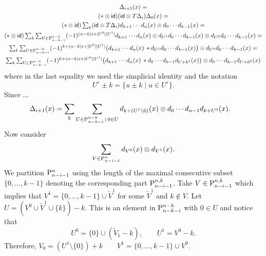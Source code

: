 \documentclass{amsart}
\begin{document}
	\begin{gather*}
		\Delta_{i+1}(x) = \\
		(\ast \otimes \mathsf{id})(\mathsf{id} \otimes T\Delta_i) \Delta_0(x) = \\
		(\ast \otimes \mathsf{id}) \textstyle\sum_k (\mathsf{id} \otimes T\Delta_i) d_{k+1} \dotsm d_n(x) \otimes d_{0} \dotsm d_{k-1}(x) = \\
		(\ast \otimes \mathsf{id})\textstyle\sum_k \sum_{U \in \mathrm{P}^{n-k}_{n-k-i}} (-1)^{(n-k)i+\lvert U^0\rvert\lvert U^1\rvert} d_{k+1} \dotsm d_n(x) \otimes d_{U^1} d_{0} \dotsm d_{k-1}(x) \otimes d_{U^0} d_{0} \dotsm d_{k-1}(x) = \\
		\textstyle\sum_k \sum_{U \in \mathrm{P}^{n-k}_{n-k-i}} (-1)^{k+(n-k)i+\lvert U^0\rvert\lvert U^1\rvert} \big( d_{k+1} \dotsm d_n(x) \, \ast d_{U^1} d_{0} \dotsm d_{k-1}(x) \big) \otimes d_{U^0} d_{0} \dotsm d_{k-1}(x) = \\
		\textstyle\sum_k \sum_{U \in \mathrm{P}^{n-k}_{n-k-i}} (-1)^{k+(n-k)i+\lvert U^0\rvert\lvert U^1\rvert} \big( d_{k+1} \dotsm d_n(x) \, \ast d_{0} \dotsm d_{k-1} d_{U+k^1}(x) \big) \otimes d_{0} \dotsm d_{k-1} d_{U+k^0}(x)
	\end{gather*}
	where in the last equality we used the simplicial identity and the notation
	\[
	U^\varepsilon \pm k = \{u \pm k \mid u \in U^\varepsilon\}.
	\]
	Since ...
	\begin{align*}
		\Delta_{i+1}(x) &=
		\sum_k \sum_{U \in \mathrm{P}^{n-k}_{n-k-i} \,|\, 0 \in U} d_{k+(U^1 \setminus 0)}(x) \otimes d_{0} \dotsm d_{u-1} d_{k+U^0}(x).
	\end{align*}
	Now consider
	\[
	\sum_{V \in \mathrm{P}^{n}_{n-i-1}} d_{V^0}(x) \otimes d_{V^1}(x).
	\]
	We partition $\mathrm{P}^{n}_{n-i-1}$ using the length of the maximal consecutive subset $\{0,\dots,k-1\}$ denoting the corresponding part $\mathrm{P}^{n,k}_{n-i-1}$.
	Take $V \in \mathrm{P}^{n,k}_{n-i-1}$ which implies that $V^1 = \{0,\dots,k-1\} \cup \widetilde V^1$ for some $\widetilde V^1$ and $k \notin V$.
	Let $U = (V^0 \cup \widetilde V^1 \cup \{k\})-k$.
	This is an element in $\mathrm{P}^{n-k}_{n-k-i}$ with $0 \in U$ and notice that
	\[
	U^0 = \{0\} \cup (\widetilde V_1-k),
	\qquad
	U^1 = V^0-k.
	\]
	Therefore,
	$V_0 = (U^1 \setminus \{0\})+k
	\qquad
	V^1 = \{0,\dots,k-1\} \cup V^0$.
\end{document}
